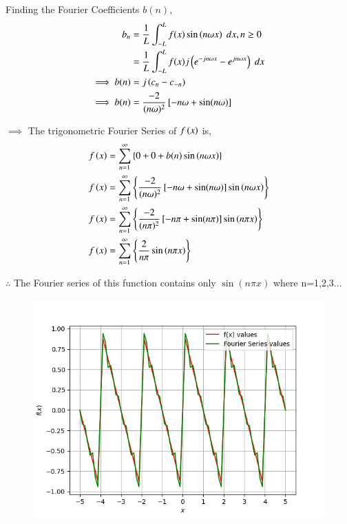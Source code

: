 \documentclass[journal,12pt,onecolumn]{IEEEtran}
\theoremstyle{remark}
\begin{document}
Finding the Fourier Coefficients $b(n)$,
\begin{align}
    b_n&=\frac{1}{L}\int_{-L}^{L}f(x)\sin\left(n\omega x\right)\;dx, n \geq 0 \\
    &= \frac{1}{L}\int_{-L}^{L}f(x)j\left(e^{-jn\omega x}-e^{jn\omega x}\right) \; dx \\
   \implies b(n) &= j\left(c_{n} - c_{-n}\right) \\
   \implies b(n)&= \frac{-2}{(n\omega )^2}{}\left[-n\omega +  \sin(n\omega)\right] 
\end{align}  

$\implies$ The trigonometric Fourier Series of $f\left(x\right)$ is,
\begin{align}
 f\left(x\right) &=\sum_{n=1}^{\infty}\left\{0+ 0 +b(n)\sin\left(n\omega x\right)\right\} \\
 f\left(x\right) &=\sum_{n=1}^{\infty}\left\{\frac{-2}{(n\omega )^2}{}\left[-n\omega +  \sin(n\omega)\right] \sin\left(n\omega x\right)\right\} \\
 f\left(x\right) &=\sum_{n=1}^{\infty}\left\{\frac{-2}{(n\pi )^2}{}\left[-n\pi +  \sin(n\pi)\right] \sin\left(n\pi x\right)\right\} \\
  f\left(x\right) &=\sum_{n=1}^{\infty}\left\{\frac{2}{n\pi } \sin\left(n\pi x\right)\right\}
 \end{align}

 $\therefore$ The Fourier series of this function contains only $\sin(n\pi x)$ where n=1,2,3...
 
 \begin{figure}[!ht]
    \centering
     \includegraphics[width=\columnwidth]{./figs/f.png}
    \caption{}    
    \label{fig:ishitha.g22.in.13.f1}
\end{figure}
 
\end{document}
